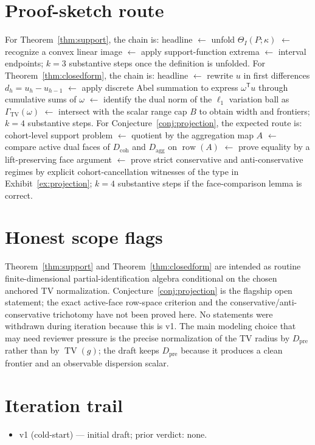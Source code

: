 \documentclass[11pt]{article}
\newcommand{\transpose}{\mathsf{T}}
\theoremstyle{definition}
\theoremstyle{plain}
\theoremstyle{remark}
\begin{document}
\section{Proof-sketch route}
For Theorem~\ref{thm:support}, the chain is: headline \(\leftarrow\) unfold \(\Theta_I(P;\kappa)\) \(\leftarrow\) recognize a convex linear image \(\leftarrow\) apply support-function extrema \(\leftarrow\) interval endpoints; \(k=3\) substantive steps once the definition is unfolded. For Theorem~\ref{thm:closedform}, the chain is: headline \(\leftarrow\) rewrite \(u\) in first differences \(d_h=u_h-u_{h-1}\) \(\leftarrow\) apply discrete Abel summation to express \(\omega^\transpose u\) through cumulative sums of \(\omega\) \(\leftarrow\) identify the dual norm of the \(\ell_1\) variation ball as \(\Gamma_{\mathrm{TV}}(\omega)\) \(\leftarrow\) intersect with the scalar range cap \(B\) to obtain width and frontiers; \(k=4\) substantive steps. For Conjecture~\ref{conj:projection}, the expected route is: cohort-level support problem \(\leftarrow\) quotient by the aggregation map \(A\) \(\leftarrow\) compare active dual faces of \(D_{\mathrm{coh}}\) and \(D_{\mathrm{agg}}\) on \(\operatorname{row}(A)\) \(\leftarrow\) prove equality by a lift-preserving face argument \(\leftarrow\) prove strict conservative and anti-conservative regimes by explicit cohort-cancellation witnesses of the type in Exhibit~\ref{ex:projection}; \(k=4\) substantive steps if the face-comparison lemma is correct.

\section{Honest scope flags}
Theorem~\ref{thm:support} and Theorem~\ref{thm:closedform} are intended as routine finite-dimensional partial-identification algebra conditional on the chosen anchored TV normalization. Conjecture~\ref{conj:projection} is the flagship open statement; the exact active-face row-space criterion and the conservative/anti-conservative trichotomy have not been proved here. No statements were withdrawn during iteration because this is v1. The main modeling choice that may need reviewer pressure is the precise normalization of the TV radius by \(D_{\mathrm{pre}}\) rather than by \(\operatorname{TV}(g)\); the draft keeps \(D_{\mathrm{pre}}\) because it produces a clean frontier and an observable dispersion scalar.

\section{Iteration trail}
\begin{itemize}[leftmargin=*]
\item v1 (cold-start) --- initial draft; prior verdict: none.
\end{itemize}
\end{document}
